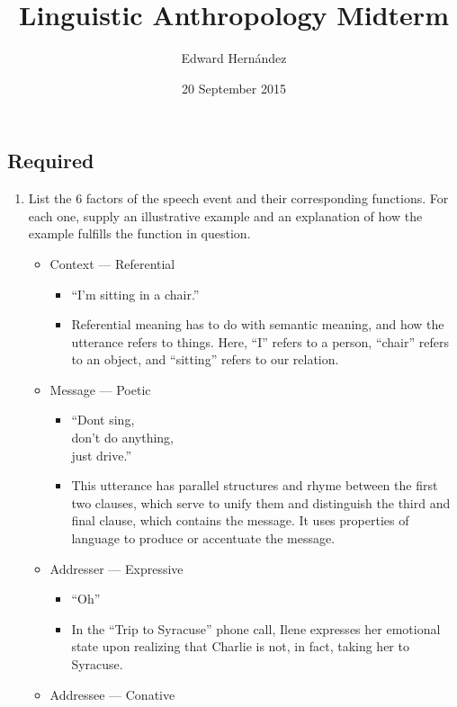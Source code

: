 \documentclass[man,12pt]{apa6}
\providecommand{\tightlist}{%
  \setlength{\itemsep}{0pt}\setlength{\parskip}{0pt}}
\begin{document}
\title{Linguistic Anthropology Midterm}
\author{Edward Hern\'{a}ndez}
\date{20 September 2015}
\maketitle

\subsection{Required}\label{required}

\begin{enumerate}
\def\labelenumi{\arabic{enumi}.}
\tightlist
\item
  List the 6 factors of the speech event and their corresponding
  functions. For each one, supply an illustrative example and an
  explanation of how the example fulfills the function in question.

  \begin{itemize}
  \tightlist
  \item
    Context --- Referential

    \begin{itemize}
    \tightlist
    \item
      ``I'm sitting in a chair.''
    \item
      Referential meaning has to do with semantic meaning, and how the
      utterance refers to things. Here, ``I'' refers to a person,
      ``chair'' refers to an object, and ``sitting'' refers to our
      relation.
    \end{itemize}
  \item
    Message --- Poetic

    \begin{itemize}
    \tightlist
    \item
      ``Dont sing,\\
      don't do anything,\\
      just drive.''
    \item
      This utterance has parallel structures and rhyme between the first
      two clauses, which serve to unify them and distinguish the third
      and final clause, which contains the message. It uses properties
      of language to produce or accentuate the message.
    \end{itemize}
  \item
    Addresser --- Expressive

    \begin{itemize}
    \tightlist
    \item
      ``Oh''
    \item
      In the ``Trip to Syracuse'' phone call, Ilene expresses her
      emotional state upon realizing that Charlie is not, in fact,
      taking her to Syracuse.
    \end{itemize}
  \item
    Addressee --- Conative


\end{itemize}
\end{enumerate}
\end{document}
